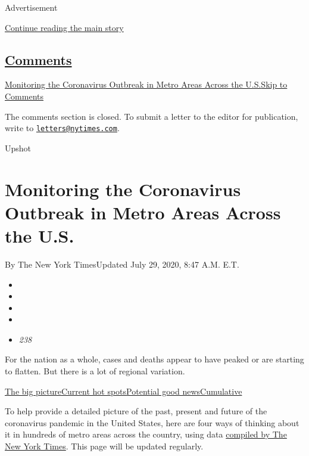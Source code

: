 Advertisement

\protect\hyperlink{after-top}{Continue reading the main story}

\hypertarget{comments}{%
\subsection{\texorpdfstring{\protect\hyperlink{commentsContainer}{Comments}}{Comments}}\label{comments}}

\href{}{Monitoring the Coronavirus Outbreak in Metro Areas Across the
U.S.}\href{}{Skip to Comments}

The comments section is closed. To submit a letter to the editor for
publication, write to
\href{mailto:letters@nytimes.com}{\nolinkurl{letters@nytimes.com}}.

Upshot

\hypertarget{monitoring-the-coronavirus-outbreak-in-metro-areas-across-the-us}{%
\section{Monitoring the Coronavirus Outbreak in Metro Areas Across the
U.S.}\label{monitoring-the-coronavirus-outbreak-in-metro-areas-across-the-us}}

By The New York TimesUpdated July 29, 2020, 8:47 A.M. E.T.

\begin{itemize}
\item
\item
\item
\item
\item
  \emph{238}
\end{itemize}

For the nation as a whole, cases and deaths appear to have peaked or are
starting to flatten. But there is a lot of regional variation.

\protect\hyperlink{big-picture}{The big
picture}\protect\hyperlink{hotspots}{Current hot
spots}\protect\hyperlink{good-news}{Potential good
news}\protect\hyperlink{cumulative}{Cumulative}

To help provide a detailed picture of the past, present and future of
the coronavirus pandemic in the United States, here are four ways of
thinking about it in hundreds of metro areas across the country, using
data
\href{https://www.nytimes.com/article/coronavirus-county-data-us.html}{compiled
by The New York Times}. This page will be updated regularly.

